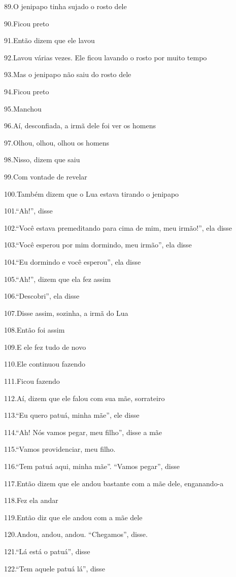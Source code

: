 89.O jenipapo tinha sujado o rosto dele

90.Ficou preto

91.Então dizem que ele lavou

92.Lavou várias vezes. Ele ficou lavando o rosto por muito tempo

93.Mas o jenipapo não saiu do rosto dele

94.Ficou preto

95.Manchou

96.Aí, desconfiada, a irmã dele foi ver os homens

97.Olhou, olhou, olhou os homens

98.Nisso, dizem que saiu

99.Com vontade de revelar

100.Também dizem que o Lua estava tirando o jenipapo

101.``Ah!'', disse

102.``Você estava premeditando para cima de mim, meu irmão!'', ela disse

103.``Você esperou por mim dormindo, meu irmão'', ela disse

104.``Eu dormindo e você esperou'', ela disse

105.``Ah!'', dizem que ela fez assim

106.``Descobri'', ela disse

107.Disse assim, sozinha, a irmã do Lua

108.Então foi assim

109.E ele fez tudo de novo

110.Ele continuou fazendo

111.Ficou fazendo

112.Aí, dizem que ele falou com sua mãe, sorrateiro

113.``Eu quero patuá, minha mãe'', ele disse

114.``Ah! Nós vamos pegar, meu filho'', disse a mãe

115.``Vamos providenciar, meu filho.

116.``Tem patuá aqui, minha mãe''. ``Vamos pegar'', disse

117.Então dizem que ele andou bastante com a mãe dele, enganando-a

118.Fez ela andar

119.Então diz que ele andou com a mãe dele

120.Andou, andou, andou. ``Chegamos'', disse.

121.``Lá está o patuá'', disse

122.``Tem aquele patuá lá'', disse

